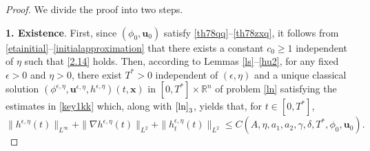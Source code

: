\documentclass[11pt,reqno]{amsart}
\numberwithin{rk}{section}
\numberwithin{prop}{section}
\numberwithin{mydef}{section}
\numberwithin{lem}{section}
\numberwithin{equation}{section}
\numberwithin{thm}{section}
\begin{document}
\begin{proof} 
We divide the proof into two steps.

\smallskip
\textbf{1. Existence}. First, since $(\phi_0,\boldsymbol{u}_0)$ satisfy \eqref{th78qq}--\eqref{th78zxq}, it follows from  \eqref{etainitial}--\eqref{initialapproximation} that  there exists a constant $c_0\geq 1$ independent of $\eta$ such that \eqref{2.14} holds. Then, according to  Lemmas \ref{ls}--\ref{hu2}, for any fixed $\epsilon>0$ and $\eta>0$, there exist $T^*>0$ independent of $(\epsilon,\eta)$ and a unique classical solution $(\phi^{\epsilon,\eta}, \boldsymbol{u}^{\epsilon,\eta}, h^{\epsilon,\eta})(t,\boldsymbol{x})$ in $[0,T^*]\times \mathbb{R}^n$  of  problem \eqref{ln} satisfying  the estimates in   \eqref{key1kk}  which, along with  $\eqref{ln}_3$, yields that, for $t\in [0,T^*]$,
\begin{equation}\label{related}
\|h^{\epsilon,\eta}(t)\|_{L^\infty}+\|\nabla h^{\epsilon,\eta}(t)\|_{L^2}+ \|h^{\epsilon,\eta}_t(t)\|_{L^2}\leq C(A, \eta, a_1, a_2, \gamma, \delta, T^*, \phi_0,\boldsymbol{u}_0).
\end{equation}


\end{proof}
\end{document}
